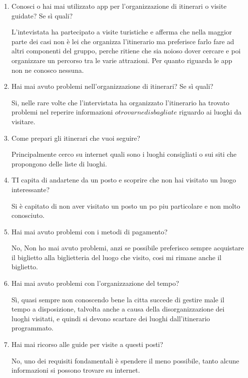 \begin{enumerate}

\item Conosci o hai mai utilizzato app per l'organizzazione di itinerari o visite guidate? Se sì quali?

L'intevistata ha partecipato a visite turistiche e afferma che nella maggior parte dei casi non è lei che organizza l'itinerario ma preferisce farlo fare ad altri componenti del gruppo, perche ritiene che sia noioso dover cercare e poi organizzare un percorso tra le varie attrazioni.
Per quanto riguarda le app non ne conosco nessuna.

\item Hai mai avuto problemi nell'organizzazione di itinerari? Se sì quali?

Si, nelle rare volte che l'intervistata ha organizzato l'itinerario ha trovato problemi nel reperire informazioni \(o trovarne di sbagliate\) riguardo ai luoghi da visitare.

\item Come prepari gli itinerari che vuoi seguire?

Principalmente cerco su internet quali sono i luoghi consigliati o sui siti che propongono delle liste di luoghi.

\item TI capita di andartene da un posto e scoprire che non hai visitato un luogo interessante?

Si è capitato di non aver visitato un posto un po piu particolare e non molto conosciuto.

\item Hai mai avuto problemi con i metodi di pagamento?

No, Non ho mai avuto problemi, anzi se possibile preferisco sempre acquistare il biglietto alla biglietteria del luogo che visito, cosi mi rimane anche il biglietto.

\item Hai mai avuto problemi con l'organizzazione del tempo?

Sì, quasi sempre non conoscendo bene la citta succede di gestire male il tempo a disposizione, talvolta anche a causa della disorganizzazione dei luoghi visitati, e quindi si devono scartare dei luoghi dall'itinerario programmato.

\item Hai mai ricorso alle guide per visite a questi posti?

No, uno dei requisiti fondamentali è spendere il meno possibile, tanto alcune informazioni si possono trovare su internet.


\end{enumerate}


